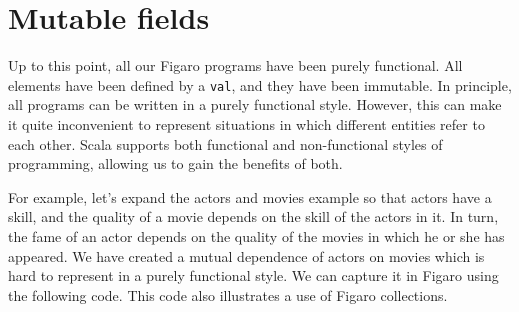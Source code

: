 \section{Mutable fields}

Up to this point, all our Figaro programs have been purely functional. All elements have been defined by a \texttt{val}, and they have been immutable. In principle, all programs can be written in a purely functional style. However, this can make it quite inconvenient to represent situations in which different entities refer to each other. Scala supports both functional and non-functional styles of programming, allowing us to gain the benefits of both.

For example, let's expand the actors and movies example so that actors have a skill, and the quality of a movie depends on the skill of the actors in it. In turn, the fame of an actor depends on the quality of the movies in which he or she has appeared. We have created a mutual dependence of actors on movies which is hard to represent in a purely functional style. We can capture it in Figaro using the following code. This code also illustrates a use of Figaro collections.

